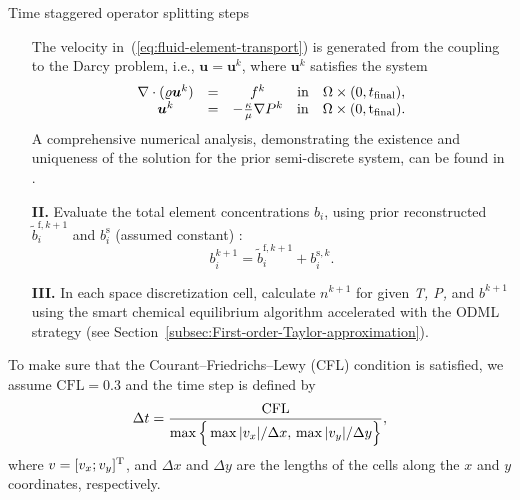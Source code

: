 \begin{frame}{Time staggered operator splitting steps}
\begin{enumerate}
		The velocity in~(\ref{eq:fluid-element-transport}) is generated
		from the coupling to the Darcy problem, i.e., $\boldsymbol{u}=\boldsymbol{u}^{k}$,
		where $\boldsymbol{u}^{k}$ satisfies the system
		\begin{equation}
			\begin{array}{cccc}
				\nabla\cdot(\varrho\boldsymbol{u}^{k}) & = & f^{k} & {\rm in}\quad\Omega\times(0,t_{{\rm final}}),\\
				\boldsymbol{u}^{k} & = & -\tfrac{\kappa}{\mu}\nabla P^{k} & {\rm in\quad\Omega\times(0,t_{{\rm final}}).}
			\end{array}\label{eq:darcy-discretized}
		\end{equation}
		A comprehensive numerical analysis, demonstrating the existence and
		uniqueness of the solution for the prior semi-discrete system, can
		be found in \citet{MaltaLoula1998,Maltaetal2000}.
		\item[\textbf{II.}] Evaluate the total element concentrations $b_{i}$, using prior reconstructed
		$\tilde{b}_{i}^{\text{f},k+1}$ and $b_{i}^{\mathrm{s}}$ (assumed
		constant) : 
		\[
		b_{i}^{k+1}=\tilde{b}_{i}^{\text{f},k+1}+b_{i}^{\text{s},k}.
		\]
		\item[\textbf{III.}] In each space discretization cell, calculate $n^{k+1}$ for given
		\emph{T, P,} and\emph{ }$b^{k+1}$ using the smart chemical equilibrium
		algorithm accelerated with the ODML strategy (see Section~\ref{subsec:First-order-Taylor-approximation}).
	\end{enumerate}
	To make sure that the Courant–Friedrichs–Lewy (CFL) condition is satisfied,
	we assume ${\mathrm{CFL}=0.3}$ and the time step is defined by
	\begin{equation}
		\Delta t=\frac{{\rm CFL}}{\max\Big\{\max|v_{x}|/\Delta x,\,\max|v_{y}|/\Delta y\Big\}},
	\end{equation}
	where $v=[v_{x};v_{y}]^{{\rm T}}$, and $\Delta x$ and $\Delta y$
	are the lengths of the cells along the $x$ and $y$ coordinates,
	respectively.
	
\end{frame}